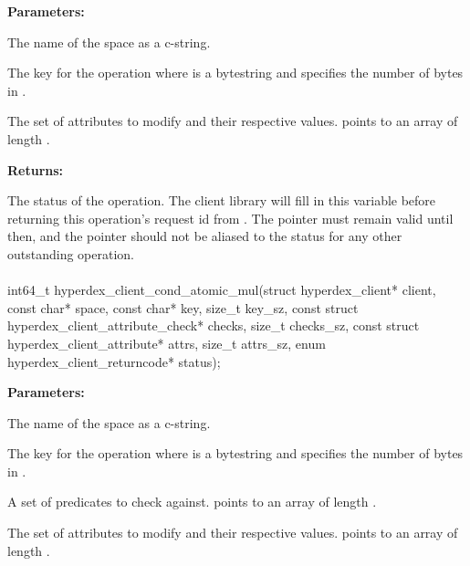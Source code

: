 \noindent\textbf{Parameters:}
\begin{description}[labelindent=\widthof{{\code{attrs}, \code{attrs\_sz}}},leftmargin=*,noitemsep,nolistsep,align=right]
\item[\code{space}] The name of the space as a c-string.
\item[\code{key}, \code{key\_sz}] The key for the operation where  is a bytestring and  specifies the number of bytes in .
\item[\code{attrs}, \code{attrs\_sz}] The set of attributes to modify and their respective values.   points to an array of length .
\end{description}

\noindent\textbf{Returns:}
\begin{description}[labelindent=\widthof{{\code{status}}},leftmargin=*,noitemsep,nolistsep,align=right]
\item[\code{status}] The status of the operation.  The client library will fill in this variable before returning this operation's request id from .  The pointer must remain valid until then, and the pointer should not be aliased to the status for any other outstanding operation.
\end{description}

\paragraph{}
\label{api:c:cond_atomic_mul}
\begin{ccode}
int64_t hyperdex_client_cond_atomic_mul(struct hyperdex_client* client,
        const char* space,
        const char* key, size_t key_sz,
        const struct hyperdex_client_attribute_check* checks, size_t checks_sz,
        const struct hyperdex_client_attribute* attrs, size_t attrs_sz,
        enum hyperdex_client_returncode* status);
\end{ccode}
\funcdesc 

\noindent\textbf{Parameters:}
\begin{description}[labelindent=\widthof{{\code{checks}, \code{checks\_sz}}},leftmargin=*,noitemsep,nolistsep,align=right]
\item[\code{space}] The name of the space as a c-string.
\item[\code{key}, \code{key\_sz}] The key for the operation where  is a bytestring and  specifies the number of bytes in .
\item[\code{checks}, \code{checks\_sz}] A set of predicates to check against.   points to an array of length .
\item[\code{attrs}, \code{attrs\_sz}] The set of attributes to modify and their respective values.   points to an array of length .
\end{description}


